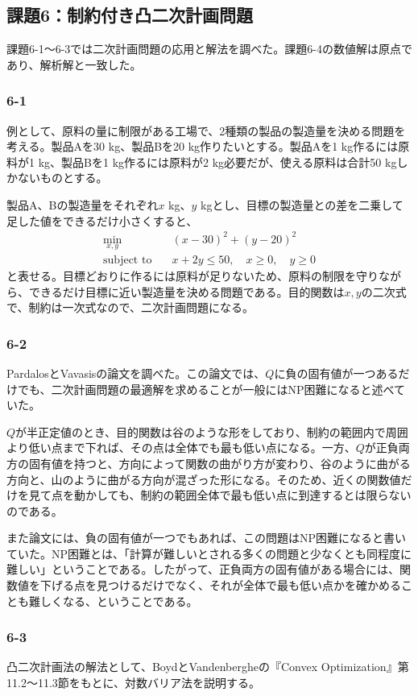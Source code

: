 \documentclass[a4j]{jarticle}
\begin{document}
\subsection{課題6：制約付き凸二次計画問題}
課題6-1〜6-3では二次計画問題の応用と解法を調べた。課題6-4の数値解は原点であり、解析解と一致した。
\subsubsection{6-1}
例として、原料の量に制限がある工場で、2種類の製品の製造量を決める問題を考える。製品Aを30 kg、製品Bを20 kg作りたいとする。製品Aを1 kg作るには原料が1 kg、製品Bを1 kg作るには原料が2 kg必要だが、使える原料は合計50 kgしかないものとする。

製品A、Bの製造量をそれぞれ$x$ kg、$y$ kgとし、目標の製造量との差を二乗して足した値をできるだけ小さくすると、
\begin{align}
  \min_{x,y}\quad &(x-30)^2+(y-20)^2\\
  \text{subject to}\quad &x+2y\le50,\quad x\ge0,\quad y\ge0
  \label{eq:production-plan}
\end{align}
と表せる。目標どおりに作るには原料が足りないため、原料の制限を守りながら、できるだけ目標に近い製造量を決める問題である。目的関数は$x,y$の二次式で、制約は一次式なので、二次計画問題になる。

\subsubsection{6-2}
PardalosとVavasisの論文\cite{pardalos}を調べた。この論文では、$Q$に負の固有値が一つあるだけでも、二次計画問題の最適解を求めることが一般にはNP困難になると述べていた。

$Q$が半正定値のとき、目的関数は谷のような形をしており、制約の範囲内で周囲より低い点まで下れば、その点は全体でも最も低い点になる。一方、$Q$が正負両方の固有値を持つと、方向によって関数の曲がり方が変わり、谷のように曲がる方向と、山のように曲がる方向が混ざった形になる。そのため、近くの関数値だけを見て点を動かしても、制約の範囲全体で最も低い点に到達するとは限らないのである。

また論文には、負の固有値が一つでもあれば、この問題はNP困難になると書いていた。NP困難とは、「計算が難しいとされる多くの問題と少なくとも同程度に難しい」ということである。したがって、正負両方の固有値がある場合には、関数値を下げる点を見つけるだけでなく、それが全体で最も低い点かを確かめることも難しくなる、ということである。

\subsubsection{6-3}
凸二次計画法の解法として、BoydとVandenbergheの『Convex Optimization』第11.2〜11.3節\cite{boyd}をもとに、対数バリア法を説明する。
\end{document}
